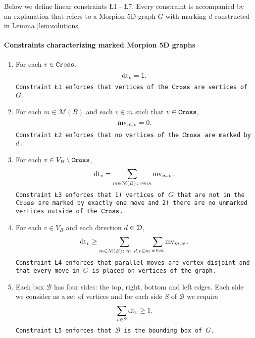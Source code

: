 Below we define linear constraints \L{1} - \L{7}. Every constraint is accompanied by an explanation that refers to 
 a Morpion 5D graph $G$ with marking $d$ constructed in Lemma \ref{lem:solutions}.
\paragraph*{Constraints characterizing marked Morpion 5D graphs} 
  \begin{enumerate}[label=\L{\arabic*}.]
  \item  For each $v \in \texttt{Cross}$,
  \[
    \operatorname{dt}_v = 1.
  \]
\noindent\texttt{\small Constraint \L{1} enforces that vertices of the $\texttt{Cross}$ are vertices of $G$.} %
\vspace{1mm}
  
  \item For each $m \in \mathcal{M}(B)$ and each $v \in m$ such that $v \in \texttt{Cross}$,
  \[
    \operatorname{mv}_{m, v} = 0.
  \]
\noindent\texttt{\small Constraint \L{2} enforces that no vertices of the $\texttt{Cross}$ are marked by $d$. }
\vspace{1mm}

  \item For each $v \in V_B \setminus \texttt{Cross}$, 
  \[ 
    \operatorname{dt}_v = \sum_{m \in \mathcal{M}(B) \colon v \in m} \operatorname{mv}_{m, v}.
  \]
\noindent\texttt{\small Constraint \L{3} enforces that 1) vertices of $G$ that are not in the $\texttt{Cross}$ are 
  marked by exactly one move and 2) there are no unmarked vertices outside of the $\texttt{Cross}$. }
\vspace{1mm}

  \item For each $v \in V_B$ and each direction $d \in \mathcal{D}$,
  \[
  	\operatorname{dt}_v \geq \sum_{m \in \mathcal{M}(B) \colon m \parallel d, v \in m} \sum_{w \in m} \operatorname{mv}_{m, w}.
  \]
\noindent\texttt{\small Constraint \L{4} enforces that parallel moves are vertex disjoint
  and that  every move in $G$ is placed on vertices of the graph. }
\vspace{1mm}

  \item Each box $\mathcal{B}$ has four sides: the top, right, bottom and left edges. Each side we consider as a set of vertices and for each side $S$ of $\mathcal{B}$ we require %
  \[
  \sum_{v \in S} \operatorname{dt}_v \geq 1.
  \]
  \noindent\texttt{\small Constraint \L{5} enforces that $\mathcal{B}$ is the bounding box of $G$. }
\end{enumerate}

